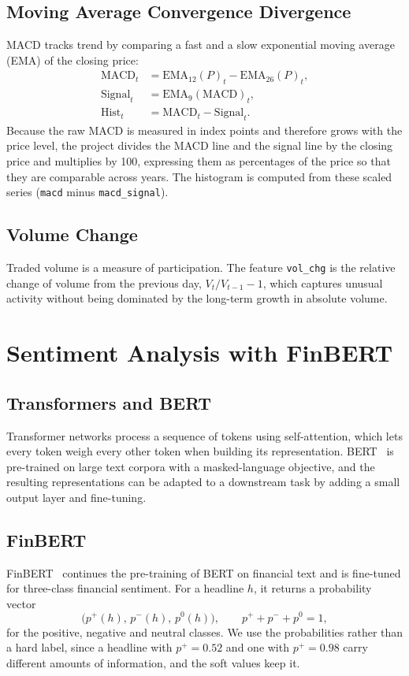 \subsection{Moving Average Convergence Divergence}
MACD tracks trend by comparing a fast and a slow exponential moving average (EMA) of the closing price:
\begin{align}
\mathrm{MACD}_t &= \mathrm{EMA}_{12}(P)_t - \mathrm{EMA}_{26}(P)_t,\\
\mathrm{Signal}_t &= \mathrm{EMA}_9(\mathrm{MACD})_t,\\
\mathrm{Hist}_t &= \mathrm{MACD}_t - \mathrm{Signal}_t.
\end{align}
Because the raw MACD is measured in index points and therefore grows with the price level, the project divides the MACD line and the signal line by the closing price and multiplies by 100, expressing them as percentages of the price so that they are comparable across years. The histogram is computed from these scaled series (\texttt{macd} minus \texttt{macd\_signal}).

\subsection{Volume Change}
Traded volume is a measure of participation. The feature \texttt{vol\_chg} is the relative change of volume from the previous day, $V_t/V_{t-1}-1$, which captures unusual activity without being dominated by the long-term growth in absolute volume.

\section{Sentiment Analysis with FinBERT}

\subsection{Transformers and BERT}
Transformer networks process a sequence of tokens using self-attention, which lets every token weigh every other token when building its representation. BERT~\cite{devlin2019bert} is pre-trained on large text corpora with a masked-language objective, and the resulting representations can be adapted to a downstream task by adding a small output layer and fine-tuning.

\subsection{FinBERT}
FinBERT~\cite{araci2019finbert} continues the pre-training of BERT on financial text and is fine-tuned for three-class financial sentiment. For a headline $h$, it returns a probability vector
\begin{equation}
\big(p^{+}(h),\, p^{-}(h),\, p^{0}(h)\big), \qquad p^{+}+p^{-}+p^{0}=1,
\end{equation}
for the positive, negative and neutral classes. We use the probabilities rather than a hard label, since a headline with $p^{+}=0.52$ and one with $p^{+}=0.98$ carry different amounts of information, and the soft values keep it.

